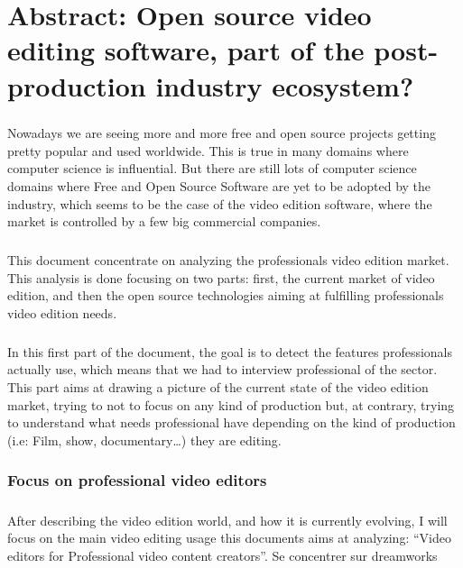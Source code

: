 \chapter*{Abstract: Open source video editing software, part of the
        post-production industry ecosystem?}

\paragraph{}

Nowadays we are seeing more and more free and open source projects getting
pretty popular and used worldwide. This is true in many domains where
computer science is influential. But there are still lots of computer
science domains where Free and Open Source Software are yet to be adopted
by the industry, which seems to be the case of the video edition software,
where the market is controlled by a few big commercial companies.

\paragraph{}

This document concentrate on analyzing the professionals
video edition market. This analysis is done focusing on two parts:
first, the current market of video edition, and then the open source
technologies aiming at fulfilling professionals video edition needs.

\paragraph{}

In this first part of the document, the goal is to detect the features
professionals actually use, which means that we had to interview professional
of the sector. This part aims at drawing a picture of the current state of
the video edition market, trying to not to focus on any kind of production
but, at contrary, trying to understand what needs professional have depending on
the kind of production (i.e: Film, show, documentary\ldots) they are editing. 

\subsection*{Focus on professional video editors} \paragraph{}
    After describing the video edition world, and how it is currently
    evolving, I will focus on the main video editing usage this documents
    aims at analyzing: ``Video editors for Professional video content
    creators''. Se concentrer sur dreamworks \cite{RobinRowe2001}

